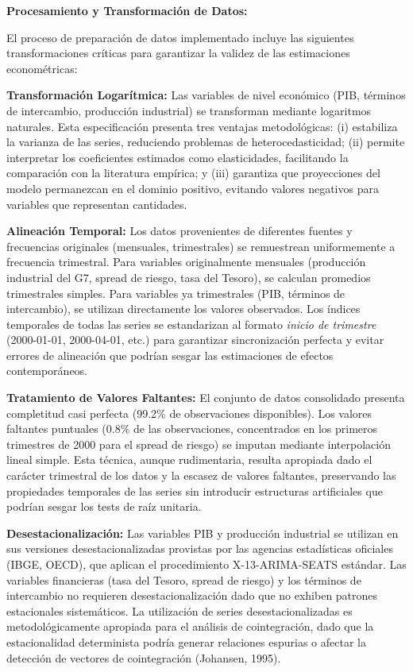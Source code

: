 \documentclass[3p,11pt]{elsarticle}
\begin{document}
\textbf{Procesamiento y Transformación de Datos:}

El proceso de preparación de datos implementado incluye las siguientes transformaciones críticas para garantizar la validez de las estimaciones econométricas:

\textbf{Transformación Logarítmica:} Las variables de nivel económico (PIB, términos de intercambio, producción industrial) se transforman mediante logaritmos naturales. Esta especificación presenta tres ventajas metodológicas: (i) estabiliza la varianza de las series, reduciendo problemas de heterocedasticidad; (ii) permite interpretar los coeficientes estimados como elasticidades, facilitando la comparación con la literatura empírica; y (iii) garantiza que proyecciones del modelo permanezcan en el dominio positivo, evitando valores negativos para variables que representan cantidades.

\textbf{Alineación Temporal:} Los datos provenientes de diferentes fuentes y frecuencias originales (mensuales, trimestrales) se remuestrean uniformemente a frecuencia trimestral. Para variables originalmente mensuales (producción industrial del G7, spread de riesgo, tasa del Tesoro), se calculan promedios trimestrales simples. Para variables ya trimestrales (PIB, términos de intercambio), se utilizan directamente los valores observados. Los índices temporales de todas las series se estandarizan al formato \textit{inicio de trimestre} (2000-01-01, 2000-04-01, etc.) para garantizar sincronización perfecta y evitar errores de alineación que podrían sesgar las estimaciones de efectos contemporáneos.

\textbf{Tratamiento de Valores Faltantes:} El conjunto de datos consolidado presenta completitud casi perfecta (99.2\% de observaciones disponibles). Los valores faltantes puntuales (0.8\% de las observaciones, concentrados en los primeros trimestres de 2000 para el spread de riesgo) se imputan mediante interpolación lineal simple. Esta técnica, aunque rudimentaria, resulta apropiada dado el carácter trimestral de los datos y la escasez de valores faltantes, preservando las propiedades temporales de las series sin introducir estructuras artificiales que podrían sesgar los tests de raíz unitaria.

\textbf{Desestacionalización:} Las variables PIB y producción industrial se utilizan en sus versiones desestacionalizadas provistas por las agencias estadísticas oficiales (IBGE, OECD), que aplican el procedimiento X-13-ARIMA-SEATS estándar. Las variables financieras (tasa del Tesoro, spread de riesgo) y los términos de intercambio no requieren desestacionalización dado que no exhiben patrones estacionales sistemáticos. La utilización de series desestacionalizadas es metodológicamente apropiada para el análisis de cointegración, dado que la estacionalidad determinista podría generar relaciones espurias o afectar la detección de vectores de cointegración (Johansen, 1995).
\end{document}
